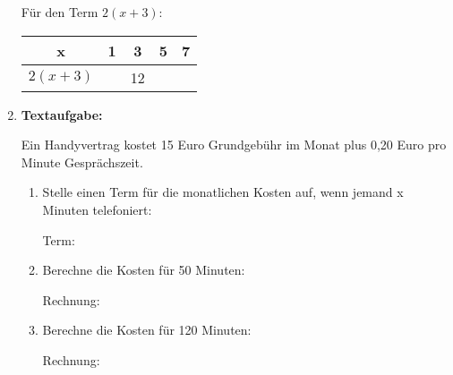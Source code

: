 \begin{enumerate}[label=\arabic*., resume]
    \vspace{0.5cm}

    Für den Term $2(x + 3)$:

    \begin{center}
        \begin{tabular}{|c|c|c|c|c|}
            \hline
            x & 1 & 3 & 5 & 7 \\
            \hline
            $2(x + 3)$ & & 12 & & \\
            \hline
        \end{tabular}
    \end{center}

    \vspace{1cm}

    \item \textbf{Textaufgabe:}

    Ein Handyvertrag kostet 15 Euro Grundgebühr im Monat plus 0,20 Euro pro Minute Gesprächszeit.

    \vspace{0.5cm}

    \begin{enumerate}[label=\alph*)]
        \item Stelle einen Term für die monatlichen Kosten auf, wenn jemand x Minuten telefoniert:
        \vspace{0.3cm}

        Term: \underline{\hspace{4cm}}

        \vspace{0.5cm}

        \item Berechne die Kosten für 50 Minuten:
        \vspace{0.3cm}

        Rechnung: \underline{\hspace{6cm}}

        \vspace{0.5cm}

        \item Berechne die Kosten für 120 Minuten:
        \vspace{0.3cm}

        Rechnung: \underline{\hspace{6cm}}

    \end{enumerate}

\end{enumerate}